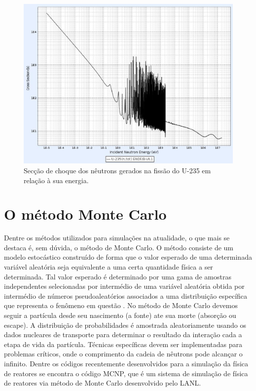 \documentclass[
	12pt,				%
	openany,			%
	twoside,			%
	a4paper,			%
	english,			%
	french,				%
	spanish,			%
	brazil				%
	]{abntex2}
\begin{document}
\begin{figure}[htpb]
	\caption{\label{PWR} Secção de choque dos nêutrons gerados na fissão do U-235 em relação à sua energia.}
	\begin{center}
	    \includegraphics[scale=0.5]{figs/secao_de_choqueXenergiaU235}
	\end{center}
\end{figure}

\section{O método Monte Carlo}

Dentre os métodos utilizados para simulações na atualidade, o que mais se destaca é, sem dúvida, o método de Monte Carlo. O método consiste de um modelo estocástico construído de forma que o valor esperado de uma determinada variável aleatória seja equivalente a uma certa quantidade física a ser determinada. Tal valor esperado é determinado por uma gama de amostras independentes selecionadas por intermédio de uma variável aleatória obtida por intermédio de números pseudoaleatórios
associados a uma distribuição específica que representa o fenômeno em questão\cite{4montecarloprinciples} \cite{5pedrao}. No método de Monte Carlo devemos seguir a partícula desde seu nascimento (a fonte) ate sua morte (absorção ou escape). A distribuição de probabilidades é amostrada aleatoriamente usando os dados nucleares de transporte\cite{6nextgeneration} para determinar o resultado da interação cada a etapa de vida da partícula. Técnicas específicas devem ser implementadas para problemas críticos, onde o comprimento da cadeia de nêutrons pode alcançar o infinito. Dentre os códigos recentemente desenvolvidos para a simulação da física de reatores se encontra o código MCNP\cite{8MCNP}, que é um sistema de simulação de física de reatores via método de Monte Carlo desenvolvido pelo LANL.
\end{document}
